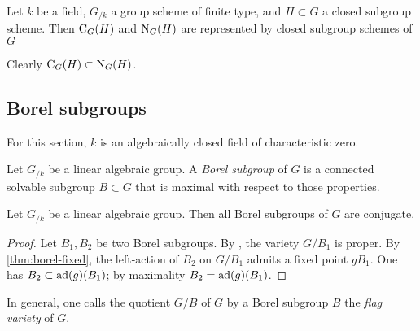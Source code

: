 \begin{corollary}
Let $k$ be a field, $G_{/k}$ a group scheme of finite type, and $H\subset G$ a 
closed subgroup scheme. Then $\operatorname{C}_G(H)$ and $\operatorname{N}_G(H)$ are 
represented by closed subgroup schemes of $G$
\end{corollary}

Clearly $\operatorname{C}_G(H)\subset \operatorname{N}_G(H)$. 





\subsection{Borel subgroups}

For this section, $k$ is an algebraically closed field of characteristic 
zero. 

\begin{definition}
Let $G_{/k}$ be a linear algebraic group. A \emph{Borel subgroup} of $G$ is 
a connected solvable subgroup $B\subset G$ that is maximal with respect to 
those properties. 
\end{definition}

\begin{theorem}\label{thm:borel-conjugate}
Let $G_{/k}$ be a linear algebraic group. Then all Borel subgroups of $G$ 
are conjugate. 
\end{theorem}
\begin{proof}
Let $B_1,B_2$ be two Borel subgroups. By \cite[18.11.a]{milne-iAG}, the 
variety $G/B_1$ is proper. By \autoref{thm:borel-fixed}, the left-action 
of $B_2$ on $G/B_1$ admits a fixed point $g B_1$. One has 
$B_2\subset\operatorname{ad}(g)(B_1)$; by maximality $B_2=\operatorname{ad}(g)(B_1)$. 
\end{proof}

In general, one calls the quotient $G/B$ of $G$ by a Borel subgroup $B$ the 
\emph{flag variety} of $G$. 

